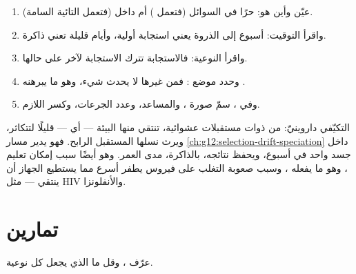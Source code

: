 \begin{method}\label{met:g12:adaptive-immunity:read}
\begin{enumerate}
  \item عيّن  وأين هو: حرًا في السوائل (فتعمل )
        أم داخل  (فتعمل  التائية السامة).
  \item واقرأ التوقيت: أسبوع إلى الذروة يعني استجابة أولية، وأيام
        قليلة تعني ذاكرة.
  \item واقرأ النوعية: فالاستجابة  تترك الاستجابة لآخر على حالها.
  \item وحدد موضع : فمن غيرها لا يحدث شيء، وهو
        ما يبرهنه .
  \item وفي ، سمّ صورة ، والمساعد، وعدد الجرعات، وكسر
         اللازم.
\end{enumerate}
\end{method}

\begin{remark}\label{rem:g12:adaptive-immunity:selection}
 التكيّفي داروينيّ:  من  ذوات مستقبلات
عشوائية، تنتقي منها البيئة --- أي  --- قليلًا لتتكاثر، ويرث
نسلها المستقبل الرابح. فهو يدير مسار
\cref{ch:g12:selection-drift-speciation} داخل جسد واحد في أسبوع، ويحفظ
نتائجه، بالذاكرة، مدى العمر. وهو أيضًا سبب إمكان تعليم ،
وهو ما يفعله ، وسبب صعوبة التغلب على فيروس يطفر أسرع مما يستطيع
الجهاز أن ينتقي --- مثل HIV والأنفلونزا.
\end{remark}

\section{تمارين}

\begin{exercise}[$\star$]\label{exo:g12:adaptive-immunity:1}
عرّف  ، وقل ما الذي يجعل كل  نوعية.
\end{exercise}

